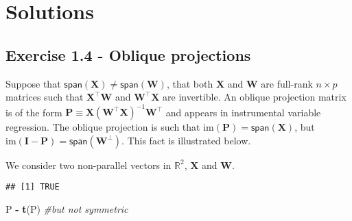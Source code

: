 \documentclass[]{book}
\newenvironment{Shaded}{\begin{snugshade}}{\end{snugshade}}
\newcommand{\CommentTok}[1]{\textcolor[rgb]{0.56,0.35,0.01}{\textit{#1}}}
\newcommand{\DecValTok}[1]{\textcolor[rgb]{0.00,0.00,0.81}{#1}}
\newcommand{\FloatTok}[1]{\textcolor[rgb]{0.00,0.00,0.81}{#1}}
\newcommand{\KeywordTok}[1]{\textcolor[rgb]{0.13,0.29,0.53}{\textbf{#1}}}
\newcommand{\NormalTok}[1]{#1}
\newcommand{\OperatorTok}[1]{\textcolor[rgb]{0.81,0.36,0.00}{\textbf{#1}}}
\newcommand{\StringTok}[1]{\textcolor[rgb]{0.31,0.60,0.02}{#1}}
\theoremstyle{definition}
\theoremstyle{definition}
\theoremstyle{definition}
\theoremstyle{remark}
\begin{document}
\hypertarget{solutions}{%
\section{Solutions}\label{solutions}}

\hypertarget{exercise-1.4---oblique-projections}{%
\subsection{Exercise 1.4 - Oblique
projections}\label{exercise-1.4---oblique-projections}}

Suppose that
\(\mathsf{span}(\mathbf{X}) \neq \mathsf{span}(\mathbf{W})\), that both
\(\mathbf{X}\) and \(\mathbf{W}\) are full-rank \(n \times p\) matrices
such that \(\mathbf{X}^\top\mathbf{W}\) and
\(\mathbf{W}^\top\mathbf{X}\) are invertible. An oblique projection
matrix is of the form
\(\mathbf{P}\equiv\mathbf{X}(\mathbf{W}^\top\mathbf{X})^{-1}\mathbf{W}^\top\)
and appears in instrumental variable regression. The oblique projection
is such that \(\mathrm{im}(\mathbf{P})=\mathsf{span}(\mathbf{X})\), but
\(\mathrm{im}(\mathbf{I}-\mathbf{P})=\mathsf{span}(\mathbf{W}^\perp)\).
This fact is illustrated below.

We consider two non-parallel vectors in \(\mathbb{R}^2\), \(\mathbf{X}\)
and \(\mathbf{W}\).

\begin{Shaded}
\end{Shaded}

\begin{verbatim}
## [1] TRUE
\end{verbatim}

\begin{Shaded}
\begin{Highlighting}[]
\NormalTok{P }\OperatorTok{-}\StringTok{ }\KeywordTok{t}\NormalTok{(P) }\CommentTok{#but not symmetric}
\end{Highlighting}
\end{Shaded}
\end{document}
